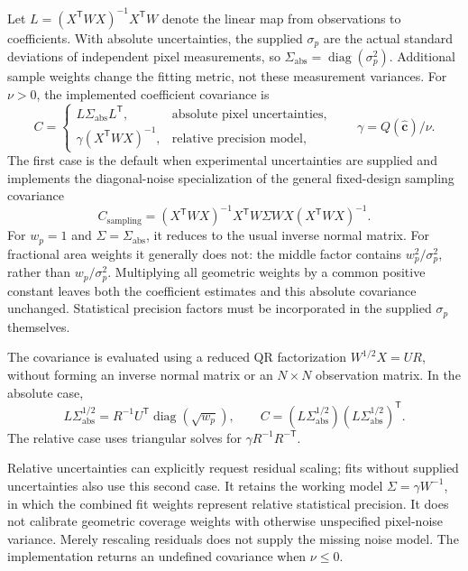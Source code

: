 \documentclass[aps,prb,preprint,onecolumn,notitlepage,amsmath,amssymb,
  superscriptaddress,floatfix]{revtex4-2}
\newcommand{\trans}{\mathsf{T}}
\begin{document}
Let $L=(X^{\trans}WX)^{-1}X^{\trans}W$ denote the linear map from
observations to coefficients. With absolute uncertainties, the supplied
$\sigma_p$ are the actual standard deviations of independent pixel
measurements, so $\Sigma_{\mathrm{abs}}=\operatorname{diag}(\sigma_p^2)$.
Additional sample weights change the fitting metric, not these measurement
variances. For $\nu>0$, the implemented coefficient covariance is
\begin{equation}
 C=\begin{cases}
 L\Sigma_{\mathrm{abs}}L^{\trans},
   &\text{absolute pixel uncertainties},\\
 \gamma(X^{\trans}WX)^{-1},
   &\text{relative precision model},
 \end{cases}
 \qquad \gamma=Q(\widehat{\bm c})/\nu.
 \label{eq:covariance}
\end{equation}
The first case is the default when experimental uncertainties are supplied
and implements the diagonal-noise specialization of the general
fixed-design sampling covariance
\begin{equation}
 C_{\mathrm{sampling}}=(X^{\trans}WX)^{-1}
 X^{\trans}W\Sigma WX(X^{\trans}WX)^{-1}.
 \label{eq:sandwich}
\end{equation}
For $w_p=1$ and $\Sigma=\Sigma_{\mathrm{abs}}$, it reduces to the usual
inverse normal matrix. For fractional area weights it generally does not:
the middle factor contains $w_p^2/\sigma_p^2$, rather than
$w_p/\sigma_p^2$. Multiplying all geometric weights by a common positive
constant leaves both the coefficient estimates and this absolute covariance
unchanged. Statistical precision factors must be incorporated in the
supplied $\sigma_p$ themselves.

The covariance is evaluated using a reduced QR factorization
$W^{1/2}X=UR$, without forming an inverse normal matrix or an $N\times N$
observation matrix. In the absolute case,
\begin{equation*}
 L\Sigma_{\mathrm{abs}}^{1/2}
 =R^{-1}U^{\trans}\operatorname{diag}(\sqrt{w_p}),
 \qquad C=(L\Sigma_{\mathrm{abs}}^{1/2})
           (L\Sigma_{\mathrm{abs}}^{1/2})^{\trans}.
\end{equation*}
The relative case uses triangular solves for
$\gamma R^{-1}R^{-\trans}$.

Relative uncertainties can explicitly request residual scaling; fits
without supplied uncertainties also use this second case. It retains the
working model $\Sigma=\gamma W^{-1}$, in which the combined fit weights
represent relative statistical precision. It does not calibrate geometric
coverage weights with otherwise unspecified pixel-noise variance. Merely
rescaling residuals does not supply the missing noise model. The
implementation returns an undefined covariance when $\nu\leq0$.
\end{document}
